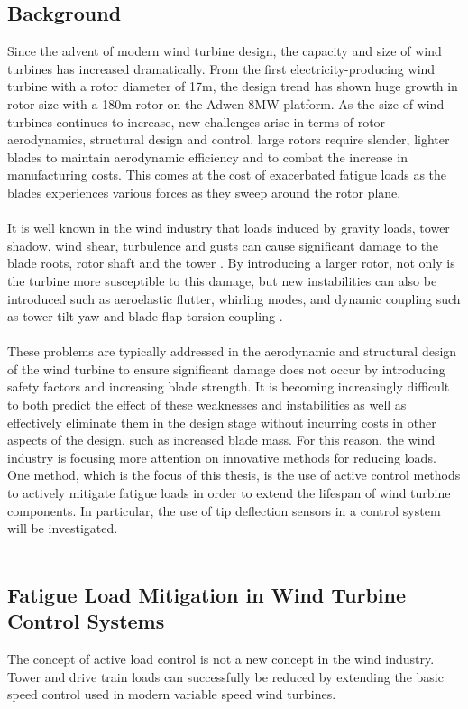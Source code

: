 
\subsection{Background}
Since the advent of modern wind turbine design, the capacity and size of wind turbines has increased dramatically. From the first electricity-producing wind turbine with a rotor diameter of 17m, the design trend has shown huge growth in rotor size with a 180m rotor on the Adwen 8MW platform. As the size of wind turbines continues to increase, new challenges arise in terms of rotor aerodynamics, structural design and control. large rotors require slender, lighter blades to maintain aerodynamic efficiency and to combat the increase in manufacturing costs. This comes at the cost of exacerbated fatigue loads as the blades experiences various forces as they sweep around the rotor plane.
\\~\\
It is well known in the wind industry that loads induced by gravity loads, tower shadow, wind shear, turbulence and gusts can cause significant damage to the blade roots, rotor shaft and the tower \cite{13_Dolan}. By introducing a larger rotor, not only is the turbine more susceptible to this damage, but new instabilities can also be introduced such as aeroelastic flutter, whirling modes, and dynamic coupling such as tower tilt-yaw and blade flap-torsion coupling \cite{7_Berg}.
\\~\\
These problems are typically addressed in the aerodynamic and structural design of the wind turbine to ensure significant damage does not occur by introducing safety factors and increasing blade strength. It is becoming increasingly difficult to both predict the effect of these weaknesses and instabilities as well as effectively eliminate them in the design stage without incurring costs in other aspects of the design, such as increased blade mass. For this reason, the wind industry is focusing more attention on innovative methods for reducing loads. One method, which is the focus of this thesis, is the use of active control methods to actively mitigate fatigue loads in order to extend the lifespan of wind turbine components. In particular, the use of tip deflection sensors in a control system will be investigated.
\\~\\
\subsection{Fatigue Load Mitigation in Wind Turbine Control Systems}
The concept of active load control is not a new concept in the wind industry. Tower and drive train loads can successfully be reduced by extending the basic speed control used in modern variable speed wind turbines.
